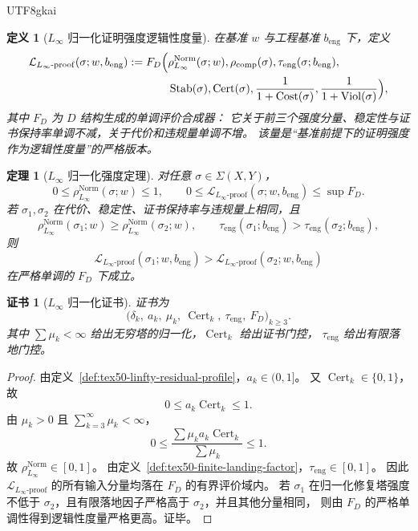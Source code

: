 \documentclass[12pt]{article}
\newtheorem{definition}{定义}[section]
\newtheorem{theorem}{定理}[section]
\newtheorem{Certificate}{证书}[section]
\newcommand{\Linfty}{\ensuremath{L_\infty}}
\newcommand{\Cert}{\operatorname{Cert}}
\newcommand{\Cost}{\operatorname{Cost}}
\newcommand{\Viol}{\operatorname{Viol}}
\newcommand{\Stab}{\operatorname{Stab}}
\newcommand{\Norm}{\operatorname{Norm}}
\begin{document}
\begin{CJK*}{UTF8}{gkai}
\begin{definition}[\texorpdfstring{$L_\infty$}{L-infinity} 归一化证明强度逻辑性度量]
\label{def:tex50-linfty-normalized-proof-logic}
在基准 $w$ 与工程基准 $b_{\mathrm{eng}}$ 下，定义
\[
\begin{aligned}
  \mathcal L_{\Linfty\text{-}\mathrm{proof}}(\sigma;w,b_{\mathrm{eng}})
  :=
  F_D\Bigl(
    &\rho_{\Linfty}^{\Norm}(\sigma;w),
    \rho_{\mathrm{comp}}(\sigma),
    \tau_{\mathrm{eng}}(\sigma;b_{\mathrm{eng}}),\\
    &\Stab(\sigma),
    \Cert(\sigma),
    \frac{1}{1+\Cost(\sigma)},
    \frac{1}{1+\Viol(\sigma)}
  \Bigr),
\end{aligned}
\]
其中 $F_D$ 为 $D$ 结构生成的单调评价合成器：
它关于前三个强度分量、稳定性与证书保持率单调不减，关于代价和违规量单调不增。
该量是“基准前提下的证明强度作为逻辑性度量”的严格版本。
\end{definition}

\begin{theorem}[\texorpdfstring{$L_\infty$}{L-infinity} 归一化强度定理]
\label{thm:tex50-linfty-normalized-strength}
对任意 $\sigma\in\Sigma(X,Y)$，
\[
  0\le
  \rho_{\Linfty}^{\Norm}(\sigma;w)
  \le1,
  \qquad
  0\le
  \mathcal L_{\Linfty\text{-}\mathrm{proof}}(\sigma;w,b_{\mathrm{eng}})
  \le
  \sup F_D.
\]
若 $\sigma_1,\sigma_2$ 在代价、稳定性、证书保持率与违规量上相同，且
\[
  \rho_{\Linfty}^{\Norm}(\sigma_1;w)\ge\rho_{\Linfty}^{\Norm}(\sigma_2;w),
  \qquad
  \tau_{\mathrm{eng}}(\sigma_1;b_{\mathrm{eng}})
  >
  \tau_{\mathrm{eng}}(\sigma_2;b_{\mathrm{eng}}),
\]
则
\[
  \mathcal L_{\Linfty\text{-}\mathrm{proof}}(\sigma_1;w,b_{\mathrm{eng}})
  >
  \mathcal L_{\Linfty\text{-}\mathrm{proof}}(\sigma_2;w,b_{\mathrm{eng}})
\]
在严格单调的 $F_D$ 下成立。
\end{theorem}

\begin{Certificate}[\texorpdfstring{$L_\infty$}{L-infinity} 归一化证书]
证书为
\[
  \bigl(
    \delta_k,\ a_k,\ \mu_k,\ \Cert_k,\ \tau_{\mathrm{eng}},\ F_D
  \bigr)_{k\ge3}.
\]
其中 $\sum\mu_k<\infty$ 给出无穷塔的归一化，$\Cert_k$ 给出证书门控，
$\tau_{\mathrm{eng}}$ 给出有限落地门控。
\end{Certificate}

\begin{proof}
由定义~\ref{def:tex50-linfty-residual-profile}，$a_k\in(0,1]$。
又 $\Cert_k\in\{0,1\}$，故
\[
  0\le a_k\Cert_k\le1.
\]
由 $\mu_k>0$ 且 $\sum_{k=3}^{\infty}\mu_k<\infty$，
\[
  0\le
  \frac{\sum\mu_k a_k\Cert_k}{\sum\mu_k}
  \le1.
\]
故 $\rho_{\Linfty}^{\Norm}\in[0,1]$。
由定义~\ref{def:tex50-finite-landing-factor}，$\tau_{\mathrm{eng}}\in[0,1]$。
因此 $\mathcal L_{\Linfty\text{-}\mathrm{proof}}$ 的所有输入分量均落在 $F_D$ 的有界评价域内。
若 $\sigma_1$ 在归一化修复塔强度不低于 $\sigma_2$，且有限落地因子严格高于 $\sigma_2$，并且其他分量相同，
则由 $F_D$ 的严格单调性得到逻辑性度量严格更高。证毕。
\end{proof}


\end{CJK*}
\end{document}

